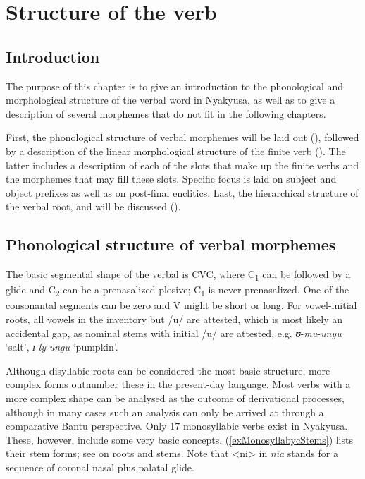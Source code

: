 \chapter{Structure of the verb}
\section{Introduction}
The purpose of this chapter is to give an introduction to the phonological and morphological structure of the verbal word in Nyakyusa, as well as to give a description of several morphemes that do not fit in the following chapters.

First, the phonological structure of verbal morphemes will be laid out (), followed by a description of the linear morphological structure of the finite verb (). The latter includes a description of each of the slots that make up the finite verbs and the morphemes that may fill these slots. Specific focus is laid on subject and object prefixes as well as on post-final enclitics. Last, the hierarchical structure of the verbal root,  and  will be discussed ().

\section{Phonological structure of verbal morphemes}\label{PhonologicalStructureVerbalMorphemes}
The basic segmental shape of the verbal  is CVC, where C\textsubscript{1} can be followed by a glide and C\textsubscript{2} can be a prenasalized plosive; C\textsubscript{1} is never prenasalized. One of the consonantal segments can be zero and V might be short or long. For vowel-initial roots, all vowels in the inventory but /u/ are attested, which is most likely an accidental gap, as nominal stems with initial /u/ are attested, e.g. \textit{ʊ}-\textit{mu}-\textit{unyu} `salt', \textit{ɪ}-\textit{ly}-\textit{ungu} `pumpkin'.

Although disyllabic roots can be considered the most basic structure, more complex forms outnumber these in the present-day language. Most verbs with a more complex shape can be analysed as the outcome of derivational processes, although in many cases such an analysis can only be arrived at through a comparative Bantu perspective. Only 17 monosyllabic verbs exist in Nyakyusa. These, however, include some very basic concepts. (\ref{exMonosyllabycStems}) lists their  {stem} forms; see  on roots and stems. Note that <ni> in \textit{nia} stands for a sequence of coronal nasal plus palatal glide.

